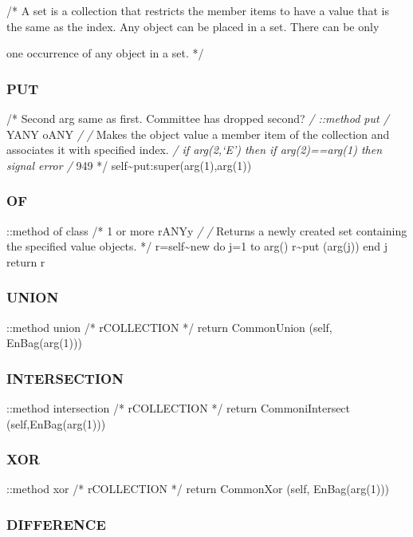 /* A set is a collection that restricts the member items to have a value
that is the same as the index. Any object can be placed in a set. There
can be only

one occurrence of any object in a set. */

\subsubsection{PUT}\label{put-2}

/* Second arg same as first. Committee has dropped second? \emph{/
::method put /} YANY oANY \emph{/ /} Makes the object value a member
item of the collection and associates it with specified index. \emph{/
if arg(2,`E') then if arg(2)==arg(1) then signal error /} 949 */
self\textasciitilde put:super(arg(1),arg(1))

\subsubsection{OF}\label{of-1}

::method of class /* 1 or more rANYy \emph{/ /} Returns a newly created
set containing the specified value objects. */ r=self\textasciitilde new
do j=1 to arg() r\textasciitilde put (arg(j)) end j return r

\subsubsection{UNION}\label{union-1}

::method union /* rCOLLECTION */ return CommonUnion (self,
EnBag(arg(1)))

\subsubsection{INTERSECTION}\label{intersection-1}

::method intersection /* rCOLLECTION */ return CommoniIntersect
(self,EnBag(arg(1)))

\subsubsection{XOR}\label{xor-1}

::method xor /* rCOLLECTION */ return CommonXor (self, EnBag(arg(1)))

\subsubsection{DIFFERENCE}\label{difference-1}

